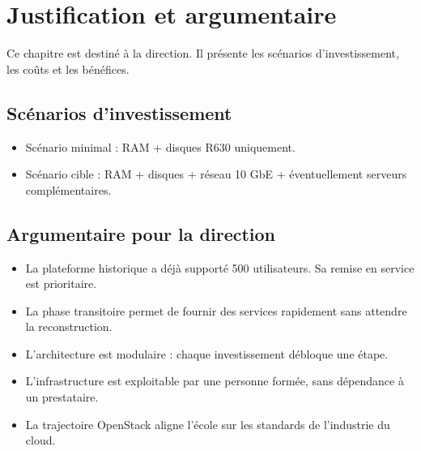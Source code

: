 \chapter{Justification et argumentaire}
\label{chap:justification}

\begin{todobox}
Ce chapitre est destiné à la direction. Il présente les scénarios d'investissement, les coûts et les bénéfices.
\end{todobox}

\section{Scénarios d'investissement}
\begin{todobox}
\begin{itemize}
  \item Scénario minimal : RAM + disques R630 uniquement.
  \item Scénario cible : RAM + disques + réseau 10 GbE + éventuellement serveurs complémentaires.
\end{itemize}
\end{todobox}

\section{Argumentaire pour la direction}
\begin{itemize}
  \item La plateforme historique a déjà supporté 500 utilisateurs. Sa remise en service est prioritaire.
  \item La phase transitoire permet de fournir des services rapidement sans attendre la reconstruction.
  \item L'architecture est modulaire : chaque investissement débloque une étape.
  \item L'infrastructure est exploitable par une personne formée, sans dépendance à un prestataire.
  \item La trajectoire OpenStack aligne l'école sur les standards de l'industrie du cloud.
\end{itemize}

